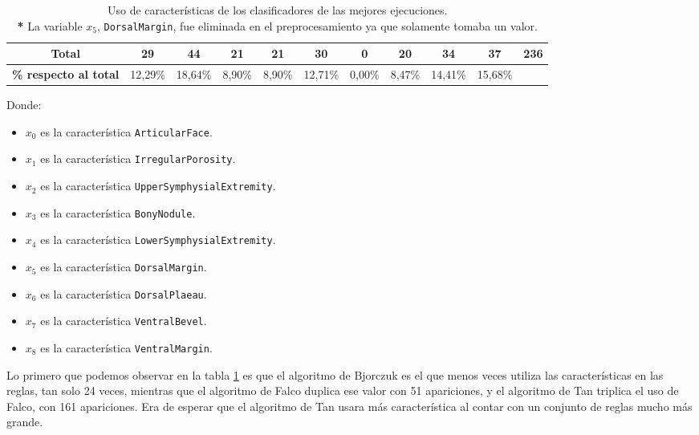 \begin{table}[H]
{\begin{tabular}{|ccccccccccc|}
\multicolumn{1}{|c|}{\textbf{Total}}                & \multicolumn{1}{c|}{29}             & \multicolumn{1}{c|}{44}             & \multicolumn{1}{c|}{21}             & \multicolumn{1}{c|}{21}             & \multicolumn{1}{c|}{30}             & \multicolumn{1}{c|}{0}              & \multicolumn{1}{c|}{20}             & \multicolumn{1}{c|}{34}             & \multicolumn{1}{c|}{37}             & 236                                 \\ \hline
\multicolumn{1}{|c|}{\textbf{\% respecto al total}} & \multicolumn{1}{c|}{12,29\%}        & \multicolumn{1}{c|}{18,64\%}        & \multicolumn{1}{c|}{8,90\%}         & \multicolumn{1}{c|}{8,90\%}         & \multicolumn{1}{c|}{12,71\%}        & \multicolumn{1}{c|}{0,00\%}         & \multicolumn{1}{c|}{8,47\%}         & \multicolumn{1}{c|}{14,41\%}        & \multicolumn{1}{c|}{15,68\%}        &                                     \\ \hline
\end{tabular}%
}
\caption{Uso de características de los clasificadores de las mejores ejecuciones.\\ \textbf{*} La variable $x_5$, \texttt{DorsalMargin}, fue eliminada en el preprocesamiento ya que solamente tomaba un valor.} \label{tablaUsoCaracteristicas}
\end{table}

Donde:

\begin{itemize}
	\item $x_0$ es la característica \texttt{ArticularFace}.
	\item $x_1$ es la característica \texttt{IrregularPorosity}.
	\item $x_2$ es la característica \texttt{UpperSymphysialExtremity}.
	\item $x_3$ es la característica \texttt{BonyNodule}.
	\item $x_4$ es la característica \texttt{LowerSymphysialExtremity}.
	\item $x_5$ es la característica \texttt{DorsalMargin}.
	\item $x_6$ es la característica \texttt{DorsalPlaeau}.
	\item $x_7$ es la característica \texttt{VentralBevel}.
	\item $x_8$ es la característica \texttt{VentralMargin}.
\end{itemize}

Lo primero que podemos observar en la tabla \ref{tablaUsoCaracteristicas} es que el algoritmo de Bjorczuk es el que menos veces utiliza las características en las reglas, tan solo 24 veces, mientras que el algoritmo de Falco duplica ese valor con 51 apariciones, y el algoritmo de Tan triplica el uso de Falco, con 161 apariciones. Era de esperar que el algoritmo de Tan usara más característica al contar con un conjunto de reglas mucho más grande.

